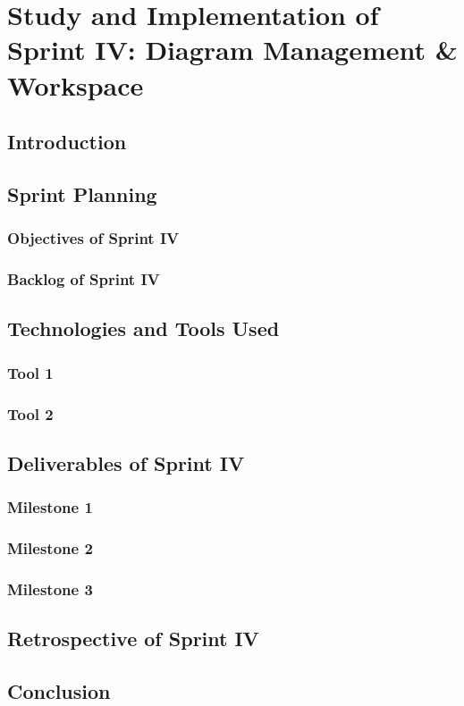 \documentclass[a4paper,12pt]{report}
\begin{document}
\chapter[Sprint IV]{Study and Implementation of Sprint IV: Diagram Management \& Workspace}

\minitoc
\section{Introduction}
\section{Sprint Planning}
\subsection{Objectives of Sprint IV}
\subsection{Backlog of Sprint IV}
\section{Technologies and Tools Used}
\subsection{Tool 1}
\subsection{Tool 2}
\section{Deliverables of Sprint IV}
\subsection{Milestone 1}
\subsection{Milestone 2}
\subsection{Milestone 3}
\section{Retrospective of Sprint IV}
\section{Conclusion}
\end{document}
